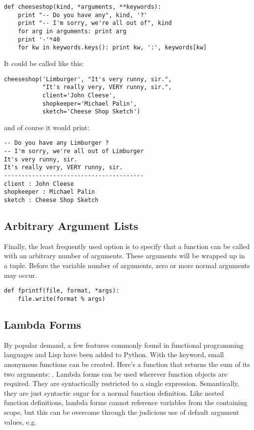 \documentclass{manual}
\begin{document}
\begin{verbatim}
def cheeseshop(kind, *arguments, **keywords):
    print "-- Do you have any", kind, '?'
    print "-- I'm sorry, we're all out of", kind
    for arg in arguments: print arg
    print '-'*40
    for kw in keywords.keys(): print kw, ':', keywords[kw]
\end{verbatim}

It could be called like this:

\begin{verbatim}
cheeseshop('Limburger', "It's very runny, sir.",
           "It's really very, VERY runny, sir.",
           client='John Cleese',
           shopkeeper='Michael Palin',
           sketch='Cheese Shop Sketch')
\end{verbatim}

and of course it would print:

\begin{verbatim}
-- Do you have any Limburger ?
-- I'm sorry, we're all out of Limburger
It's very runny, sir.
It's really very, VERY runny, sir.
----------------------------------------
client : John Cleese
shopkeeper : Michael Palin
sketch : Cheese Shop Sketch
\end{verbatim}

\subsection{Arbitrary Argument Lists \label{arbitraryArgs}}

Finally, the least frequently used option is to specify that a
function can be called with an arbitrary number of arguments.  These
arguments will be wrapped up in a tuple.  Before the variable number
of arguments, zero or more normal arguments may occur.

\begin{verbatim}
def fprintf(file, format, *args):
    file.write(format % args)
\end{verbatim}


\subsection{Lambda Forms \label{lambda}}

By popular demand, a few features commonly found in functional
programming languages and Lisp have been added to Python.  With the
 keyword, small anonymous functions can be created.
Here's a function that returns the sum of its two arguments:
.  Lambda forms can be used wherever function
objects are required.  They are syntactically restricted to a single
expression.  Semantically, they are just syntactic sugar for a normal
function definition.  Like nested function definitions, lambda forms
cannot reference variables from the containing scope, but this can be
overcome through the judicious use of default argument values, e.g.
\end{document}
